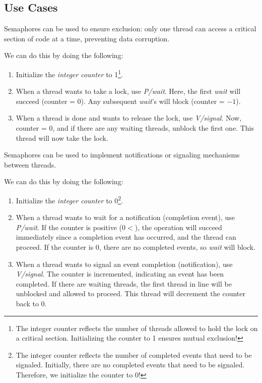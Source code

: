 \documentclass{report}
\newcommand{\exampleBegin}[1]{\begin{tcolorbox}[colback=blue!5!white,colframe=black!75!blue,title={Example:
      #1}]}
\newcommand{\exampleEnd}{\end{tcolorbox}}
\begin{document}
\subsection{Use Cases}
\exampleBegin{Exclusion}
Semaphores can be used to ensure exclusion: only one thread can access a critical section of code at
a time, preventing data corruption.

We can do this by doing the following:
\begin{enumerate}[label=\textit{(\roman*)}]
\item Initialize the \textit{integer counter} to 1\footnote{The integer counter reflects the number
    of threads allowed to hold the lock on a critical section. Initializing the counter to 1 ensures
    mutual exclusion!}. 
\item When a thread wants to take a lock, use \textit{P/wait}. Here, the first \textit{wait} will
  succeed (counter = 0). Any subsequent \textit{wait}'s will block (counter = $-1$).
\item When a thread is done and wants to release the lock, use \textit{V/signal}. Now, counter = 0,
  and if there are any waiting threads, unblock the first one. This thread will now take the lock.
\end{enumerate}
\exampleEnd

\exampleBegin{Notifications}
Semaphores can be used to implement notifications or signaling mechanisms between threads.

We can do this by doing the following:
\begin{enumerate}[label=\textit{(\roman*)}]
\item Initialize the \textit{integer counter} to 0\footnote{The integer counter reflects the number
    of completed events that need to be signaled. Initially, there are no completed events that need
  to be signaled. Therefore, we initialize the counter to 0!}. 
\item When a thread wants to wait for a notification (completion event), use \textit{P/wait}. If the
  counter is positive ($0 <$), the operation will succeed immediately since a completion event has
  occurred, and the thread can proceed. If the counter is 0, there are no completed events, so \textit{wait} will block.
\item When a thread wants to signal an event completion (notification), use \textit{V/signal}. The counter is incremented,
  indicating an event has been completed. If there are waiting threads, the first thread in line
  will be unblocked and allowed to proceed. This thread will decrement the counter back to 0.
\end{enumerate}
\exampleEnd
\end{document}

